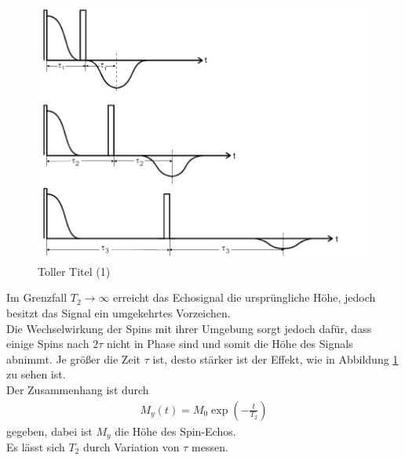 \documentclass[]{scrartcl}
\begin{document}
\begin{figure}[H]
\centering
\includegraphics[width=12cm]{images/tauechohoehe.png}
\caption{Toller Titel (1)}
\label{fig::tauechohoehe}
\end{figure}
Im Grenzfall $T_2 \to \infty$ erreicht das Echosignal die ursprüngliche Höhe, jedoch besitzt das Signal ein umgekehrtes Vorzeichen.\\
Die Wechselwirkung der Spins mit ihrer Umgebung sorgt jedoch dafür, dass einige Spins nach $2\tau$ nicht in Phase sind und somit die Höhe des Signals abnimmt. Je größer die Zeit $\tau$ ist, desto stärker ist der Effekt, wie in Abbildung \ref{fig::tauechohoehe} zu sehen ist.\\
Der Zusammenhang ist durch
\begin{align}
M_y\left(t\right)=M_0\exp \left(-\frac{t}{T_2}\right)\label{eq::rechnung_tau_spin_echo}
\end{align} 
gegeben, dabei ist $M_y$ die Höhe des Spin-Echos.\\ 
Es lässt sich $T_2$ durch Variation von $\tau$ messen.
\end{document}
